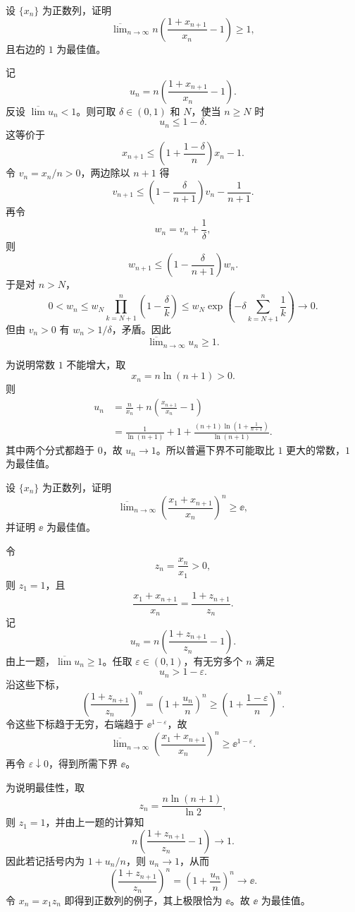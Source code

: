 \begin{xreferenceproblem}[第一组参考题 9]
设 $\{x_n\}$ 为正数列，证明
\[
  \overline{\lim}_{n\to\infty}
  n\left(\frac{1+x_{n+1}}{x_n}-1\right)\geqslant1,
\]
且右边的 $1$ 为最佳值。
\end{xreferenceproblem}
\begin{xsolution}
记
\[
  u_n=n\left(\frac{1+x_{n+1}}{x_n}-1\right).
\]
反设 $\overline{\lim}u_n<1$。则可取 $\delta\in(0,1)$ 和 $N$，使当 $n\geqslant N$ 时
\[
  u_n\leqslant1-\delta.
\]
这等价于
\[
  x_{n+1}\leqslant
  \left(1+\frac{1-\delta}{n}\right)x_n-1.
\]
令 $v_n=x_n/n>0$，两边除以 $n+1$ 得
\[
  v_{n+1}
  \leqslant
  \left(1-\frac{\delta}{n+1}\right)v_n-\frac1{n+1}.
\]
再令
\[
  w_n=v_n+\frac1\delta,
\]
则
\[
  w_{n+1}\leqslant
  \left(1-\frac{\delta}{n+1}\right)w_n.
\]
于是对 $n>N$，
\[
  0<w_n
  \leqslant w_N\prod_{k=N+1}^{n}\left(1-\frac\delta k\right)
  \leqslant w_N\exp\left(-\delta\sum_{k=N+1}^{n}\frac1k\right)
  \longrightarrow0.
\]
但由 $v_n>0$ 有 $w_n>1/\delta$，矛盾。因此
\[
  \overline{\lim}_{n\to\infty}u_n\geqslant1.
\]

为说明常数 $1$ 不能增大，取
\[
  x_n=n\ln(n+1)>0.
\]
则
\begin{align*}
  u_n
  &=\frac{n}{x_n}+n\left(\frac{x_{n+1}}{x_n}-1\right)\\
  &=\frac1{\ln(n+1)}
    +1+
    \frac{(n+1)\ln\left(1+\frac1{n+1}\right)}{\ln(n+1)}.
\end{align*}
其中两个分式都趋于 $0$，故 $u_n\to1$。所以普遍下界不可能取比 $1$ 更大的常数，$1$ 为最佳值。
\end{xsolution}

\begin{xreferenceproblem}[第一组参考题 10]
设 $\{x_n\}$ 为正数列，证明
\[
  \overline{\lim}_{n\to\infty}
  \left(\frac{x_1+x_{n+1}}{x_n}\right)^n\geqslant\ee,
\]
并证明 $\ee$ 为最佳值。
\end{xreferenceproblem}
\begin{xsolution}
令
\[
  z_n=\frac{x_n}{x_1}>0,
\]
则 $z_1=1$，且
\[
  \frac{x_1+x_{n+1}}{x_n}
  =\frac{1+z_{n+1}}{z_n}.
\]
记
\[
  u_n=n\left(\frac{1+z_{n+1}}{z_n}-1\right).
\]
由上一题，$\overline{\lim}u_n\geqslant1$。任取 $\varepsilon\in(0,1)$，有无穷多个 $n$ 满足
\[
  u_n>1-\varepsilon.
\]
沿这些下标，
\[
  \left(\frac{1+z_{n+1}}{z_n}\right)^n
  =\left(1+\frac{u_n}{n}\right)^n
  \geqslant
  \left(1+\frac{1-\varepsilon}{n}\right)^n.
\]
令这些下标趋于无穷，右端趋于 $\ee^{1-\varepsilon}$，故
\[
  \overline{\lim}_{n\to\infty}
  \left(\frac{x_1+x_{n+1}}{x_n}\right)^n
  \geqslant\ee^{1-\varepsilon}.
\]
再令 $\varepsilon\downarrow0$，得到所需下界 $\ee$。

为说明最佳性，取
\[
  z_n=\frac{n\ln(n+1)}{\ln2},
\]
则 $z_1=1$，并由上一题的计算知
\[
  n\left(\frac{1+z_{n+1}}{z_n}-1\right)\to1.
\]
因此若记括号内为 $1+u_n/n$，则 $u_n\to1$，从而
\[
  \left(\frac{1+z_{n+1}}{z_n}\right)^n
  =\left(1+\frac{u_n}{n}\right)^n\to\ee.
\]
令 $x_n=x_1z_n$ 即得到正数列的例子，其上极限恰为 $\ee$。故 $\ee$ 为最佳值。
\end{xsolution}

